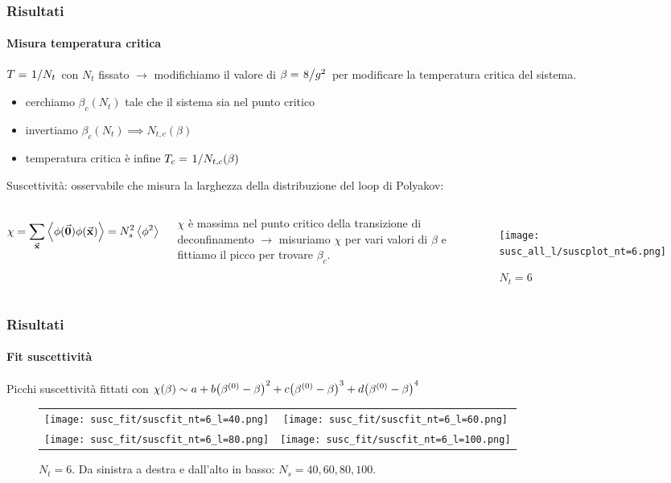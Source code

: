 \documentclass{beamer}
\begin{document}
\begin{frame}
	\frametitle{Risultati}
	\framesubtitle{Misura temperatura critica}

	$T = \flatfrac{1}{N_t}$ con $N_t$ fissato $\rightarrow$ modifichiamo il valore di $\beta = \flatfrac{8}{g^2}$ per modificare
	la temperatura critica del sistema. 

	\begin{itemize}
		\item cerchiamo $\beta_c(N_t)$ tale che il sistema sia nel punto critico
		\item invertiamo $\beta_c(N_t) \implies N_{t,c}(\beta)$
		\item temperatura critica è infine $T_c = \flatfrac{1}{N_{t,c}(\beta)}$
	\end{itemize}

	\alert{Suscettività}: osservabile che misura la larghezza della distribuzione del loop di Polyakov:

	\begin{columns}
			\begin{equation*}
				\chi = \sum_{\va{x}} \expval{\phi(\va{0}) \phi(\va{x})} = N_s^2 \expval{\phi^2}
			\end{equation*}
		
			$\chi$ è massima nel punto critico della transizione di deconfinamento $\rightarrow$ misuriamo $\chi$ per vari valori
			di $\beta$ e fittiamo il picco per trovare $\beta_c$.

		\begin{figure}[h]
				\texttt{[image: susc\_all\_l/suscplot\_nt=6.png]}
				\caption{$N_t = 6$}
			\end{figure}
						
	\end{columns}
\end{frame}

\begin{frame}
	\frametitle{Risultati}
	\framesubtitle{Fit suscettività}

	Picchi suscettività fittati con
	$\chi(\beta) \sim a + b\qty(\beta^{(0)} - \beta)^2 + c\qty(\beta^{(0)} - \beta)^3 + d\qty(\beta^{(0)} - \beta)^4$

	\begin{figure}[h]
		\centering
		\begin{tabular}{c c}
			\texttt{[image: susc\_fit/suscfit\_nt=6\_l=40.png]} &
			\texttt{[image: susc\_fit/suscfit\_nt=6\_l=60.png]}
			\\
			\texttt{[image: susc\_fit/suscfit\_nt=6\_l=80.png]} &
			\texttt{[image: susc\_fit/suscfit\_nt=6\_l=100.png]}
		\end{tabular}
		\caption{$N_t = 6$. Da sinistra a destra e dall'alto in basso: $N_s = 40, 60, 80, 100$.}
	\end{figure}
\end{frame}
\end{document}

